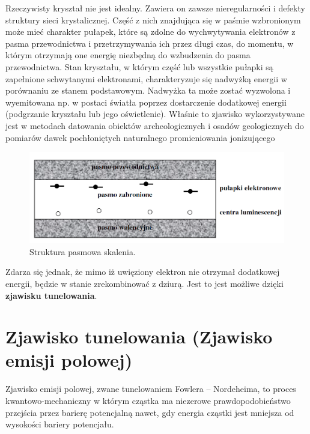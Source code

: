 Rzeczywisty kryształ nie jest idealny. Zawiera on zawsze nieregularności i defekty struktury sieci krystalicznej. Część z nich znajdująca się w paśmie wzbronionym może mieć charakter pułapek, które są zdolne do wychwytywania
elektronów z pasma przewodnictwa i przetrzymywania ich przez długi czas, do
momentu, w którym otrzymają one energię niezbędną do wzbudzenia do pasma przewodnictwa. Stan kryształu, w którym część lub wszystkie pułapki są zapełnione schwytanymi elektronami,
charakteryzuje się nadwyżką energii w porównaniu ze stanem podstawowym.  Nadwyżka ta może zostać wyzwolona i wyemitowana np. w postaci światła poprzez dostarczenie dodatkowej energii (podgrzanie kryształu lub jego oświetlenie). Właśnie to zjawisko wykorzystywane jest w metodach datowania obiektów archeologicznych
i osadów geologicznych do pomiarów dawek pochłoniętych naturalnego
promieniowania jonizującego 
\begin{figure}[h]
\centering
\includegraphics[width=15cm]{strukturapasmowa}
\caption{Struktura pasmowa skalenia.}
\label{fig:Struktura pasmowa}
\end{figure}

Zdarza się jednak, że mimo iż uwięziony elektron nie otrzymał dodatkowej energii, będzie w stanie zrekombinować z dziurą. Jest to jest możliwe dzięki  \textbf{zjawisku tunelowania}.

\section{Zjawisko tunelowania (Zjawisko emisji polowej)}
Zjawisko emisji polowej, zwane tunelowaniem Fowlera – Nordeheima, to  proces kwantowo-mechaniczny w którym cząstka ma niezerowe prawdopodobieństwo przejścia przez barierę potencjalną nawet, gdy energia cząstki jest mniejsza od wysokości bariery potencjału.


